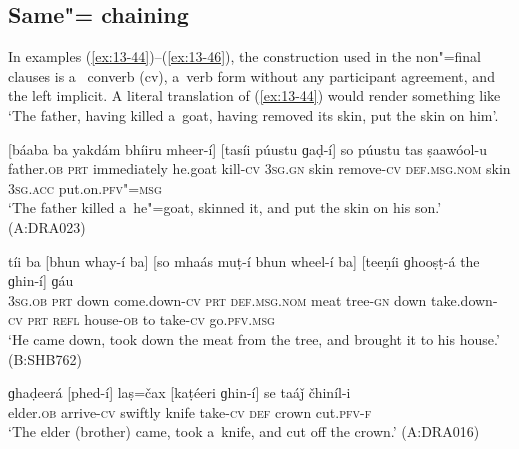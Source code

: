 \subsection{Same"= chaining}
\label{subsec:13-3-1}

In examples (\ref{ex:13-44})--(\ref{ex:13-46}), the construction used in the non"=final clauses is a~ converb (cv), a~verb form without any participant agreement, and the  left implicit. A literal translation of (\ref{ex:13-44}) would render something like `The father, having killed a~goat, having removed its skin, put the skin on him'. 

\begin{exe}
\ex
\label{ex:13-44}
\gll \label{bkm:Ref190770484}[báaba ba yakdám bhíiru mheer-í] [tasíi púustu ɡaḍ-í] so púustu tas ṣaawóol-u  \\
father.\textsc{ob} \textsc{prt} immediately he.goat kill-\textsc{cv} \textsc{3sg.gn} skin  remove-\textsc{cv} \textsc{def.msg.nom} skin \textsc{3sg.acc} put.on.\textsc{pfv"=msg} \\
\glt `The father killed a~he"=goat, skinned it, and put the skin on his son.' (A:DRA023)

\ex
\label{ex:13-45}
\gll tíi ba [bhun whay-í ba] [so  mhaás muṭ-í bhun wheel-í ba] [teeṇíi
  ɡhooṣṭ-á the ɡhin-í] ɡáu \\
\textsc{3sg.ob} \textsc{prt} down come.down-\textsc{cv} \textsc{prt} \textsc{def.msg.nom}  meat tree-\textsc{gn} down take.down-\textsc{cv} \textsc{prt} \textsc{refl} house-\textsc{ob}  to take-\textsc{cv} go.\textsc{pfv.msg} \\
\glt `He came down, took down the meat from the tree, and brought it to his house.' (B:SHB762)

\ex
\label{ex:13-46}
\gll ɡhaḍeerá [phed-í] laṣ=čax [kaṭéeri ɡhin-í] se taáǰ čhiníl-i  \\
elder.\textsc{ob} arrive-\textsc{cv} swiftly knife take-\textsc{cv} \textsc{def} crown cut.\textsc{pfv-f} \\
\glt `The elder (brother) came, took a~knife, and cut off the crown.' (A:DRA016) 
\end{exe}

